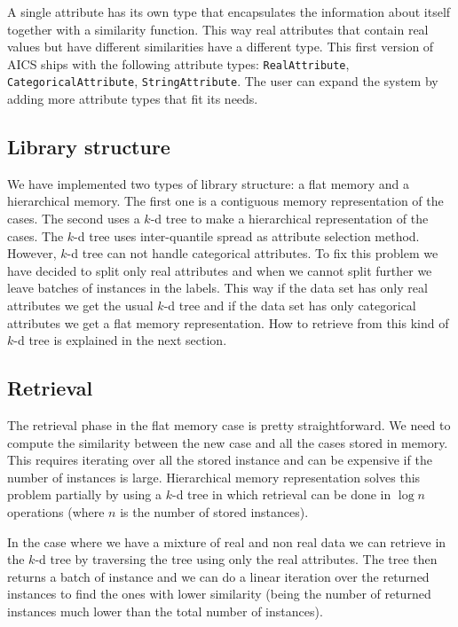 \documentclass[11pt]{article}
\begin{document}
A single attribute has its own type that encapsulates the information about itself together with a similarity function. This way real attributes that contain real values but have different similarities have a different type. This first version of AICS ships with the following attribute types: \texttt{RealAttribute}, \texttt{CategoricalAttribute}, \texttt{StringAttribute}. The user can expand the system by adding more attribute types that fit its needs.

\subsection{Library structure}

We have implemented two types of library structure: a flat memory and a hierarchical memory. The first one is a contiguous memory representation of the cases. The second uses a $k$-d tree to make a hierarchical representation of the cases. The $k$-d tree uses inter-quantile spread as attribute selection method. However, $k$-d tree can not handle categorical attributes. To fix this problem we have decided to split only real attributes and when we cannot split further we leave batches of instances in the labels. This way if the data set has only real attributes we get the usual $k$-d tree and if the data set has only categorical attributes we get a flat memory representation. How to retrieve from this kind of $k$-d tree is explained in the next section.

\subsection{Retrieval}

The retrieval phase in the flat memory case is pretty straightforward. We need to compute the similarity between the new case and all the cases stored in memory. This requires iterating over all the stored instance and can be expensive if the number of instances is large. Hierarchical memory representation solves this problem partially by using a $k$-d tree in which retrieval can be done in $\log n$ operations (where $n$ is the number of stored instances). 

In the case where we have a mixture of real and non real data we can retrieve in the $k$-d tree by traversing the tree using only the real attributes. The tree then returns a batch of instance and we can do a linear iteration over the returned instances to find the ones with lower similarity (being the number of returned instances much lower than the total number of instances).
\end{document}
